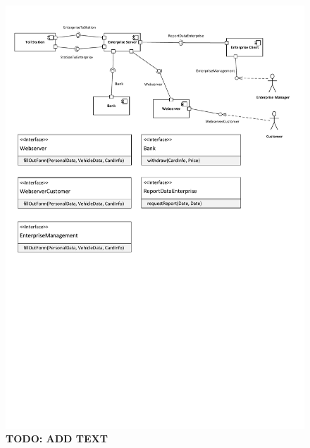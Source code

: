 \begin{figure}
\centerline{\includegraphics[width=\textwidth]{img/component_diagrams/ComponentDiagram_Enterprise}}
\caption{\textbf{TODO: ADD TEXT}}
\label{fig:cd_e}
\end{figure}


